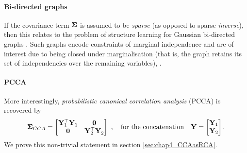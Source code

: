       \paragraph{Bi-directed graphs} If the covariance term $\mathbf{\Sigma}$ is assumed to be \textit{sparse} (as opposed to sparse-\textit{inverse}), then this relates to the problem of structure learning for Gaussian bi-directed graphs \citep{Silva:ADMGStructure11}.
      Such graphs encode constraints of marginal independence and are of interest due to being closed under marginalisation (that is, the graph retains its set of independencies over the remaining variables), \citep{Richardson:Ancestral02}.

      \paragraph{PCCA} More interestingly, \textit{probabilistic canonical correlation analysis} (PCCA) \citep{Bach:pcca05, Bach:kica02} is recovered by
      \begin{equation*}
	\bSigma_{CCA} = \mat{ \mb{Y}^\top_1 \mb{Y}^{~}_1 &\mb{0} \\ \mb{0} &\mb{Y}^\top_2 \mb{Y}_2^{~} } ~, %
	\quad \textrm{for the concatenation} \quad \mb{Y} = \mat{ \mb{Y}_1 \\ \mb{Y}_2 }.
      \end{equation*}
      We prove this non-trivial statement in section \ref{sec:chap4_CCAasRCA}.

